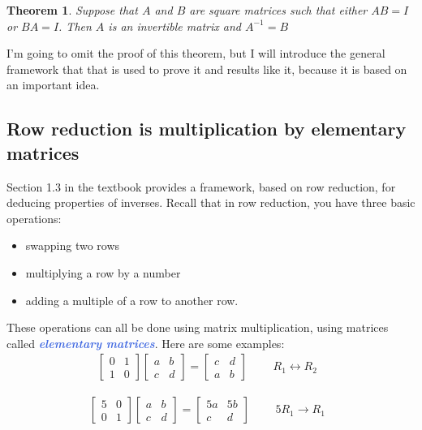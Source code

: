 \documentclass[10pt]{article}
\newcommand{\demph}[1]{\textcolor{RoyalBlue}{\textbf{\slshape #1}}} %
\newtheorem{theorem}{Theorem}
\theoremstyle{definition}
\begin{document}
\begin{theorem}
  \label{thm:one-sided-inverse-is-enough}
  Suppose that $A$ and $B$ are square matrices such that either $AB=I$ or
  $BA=I$. Then $A$ is an invertible matrix and $A^{-1}=B$
\end{theorem}

I'm going to omit the proof of this theorem, but I will introduce the general
framework that that is used to prove it and results like it, because it is
based on an important idea.

\subsection{Row reduction is multiplication by elementary matrices}
\label{sec:row-reduction-multiplication-elementary-matrices}
Section 1.3 in the textbook provides a framework, based on row reduction, for
deducing properties of inverses. Recall that in row reduction, you have three
basic operations:
\begin{itemize}
  \item swapping two rows
  \item multiplying a row by a number
  \item adding a multiple of a row to another row.
\end{itemize}
These operations can all be done using matrix multiplication, using matrices
called \demph{elementary matrices}. Here are some examples:
\begin{align*}
  \begin{bmatrix}
    0&1\\
    1&0
  \end{bmatrix}
  \begin{bmatrix}
    a&b\\
    c&d
  \end{bmatrix}
  =
  \begin{bmatrix}
    c&d\\
    a&b
  \end{bmatrix}
  &&\text{ $R_{1}\leftrightarrow R_{2} $ }
\end{align*}

\begin{align*}
  \begin{bmatrix}
    5&0\\
    0&1
  \end{bmatrix}
  \begin{bmatrix}
    a&b\\
    c&d
  \end{bmatrix}
  =
  \begin{bmatrix}
    5a&5b\\
    c&d
  \end{bmatrix}
  &&\text{ $5R_{1} \to R_{1}$ }
\end{align*}
\end{document}

